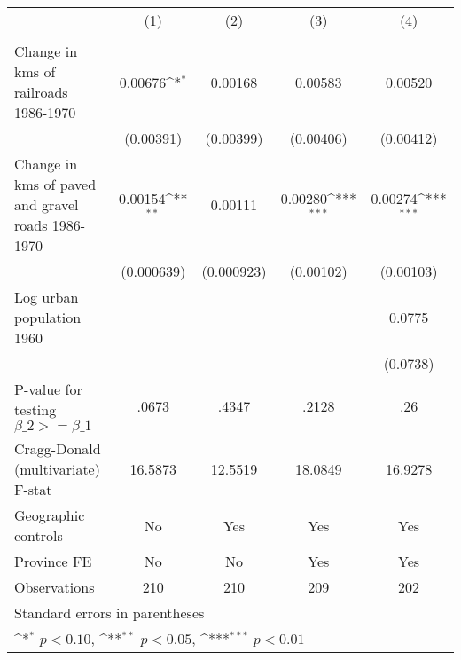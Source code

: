 {
\def\sym#1{\ifmmode^{#1}\else\(^{#1}\)\fi}
\begin{tabular}{l*{4}{c}}
\hline\hline
                &\multicolumn{1}{c}{(1)}&\multicolumn{1}{c}{(2)}&\multicolumn{1}{c}{(3)}&\multicolumn{1}{c}{(4)}\\
                &\multicolumn{1}{c}{}&\multicolumn{1}{c}{}&\multicolumn{1}{c}{}&\multicolumn{1}{c}{}\\
\hline
Change in kms of railroads 1986-1970&  0.00676\sym{*}  &  0.00168         &  0.00583         &  0.00520         \\
                &(0.00391)         &(0.00399)         &(0.00406)         &(0.00412)         \\
[1em]
Change in kms of paved and gravel roads 1986-1970&  0.00154\sym{**} &  0.00111         &  0.00280\sym{***}&  0.00274\sym{***}\\
                &(0.000639)         &(0.000923)         &(0.00102)         &(0.00103)         \\
[1em]
Log urban population 1960&                  &                  &                  &   0.0775         \\
                &                  &                  &                  & (0.0738)         \\
\hline
P-value for testing $\beta\_{2} >= \beta\_{1}$&    .0673         &    .4347         &    .2128         &      .26         \\
Cragg-Donald (multivariate) F-stat&  16.5873         &  12.5519         &  18.0849         &  16.9278         \\
Geographic controls&       No         &      Yes         &      Yes         &      Yes         \\
Province FE     &       No         &       No         &      Yes         &      Yes         \\
Observations    &      210         &      210         &      209         &      202         \\
\hline\hline
\multicolumn{5}{l}{\footnotesize Standard errors in parentheses}\\
\multicolumn{5}{l}{\footnotesize \sym{*} \(p<0.10\), \sym{**} \(p<0.05\), \sym{***} \(p<0.01\)}\\
\end{tabular}
}
